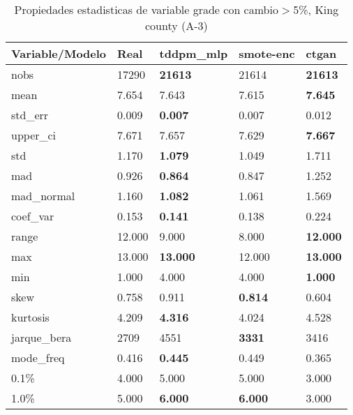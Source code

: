 \begin{table}[H]
\centering
\fontsize{8}{14}\selectfont
\caption{Propiedades estadisticas de variable grade con cambio\ensuremath{>}5\%, King county (A-3)}
\label{table-stats-king county-a-3-grade-short}
\begin{tabular}{|l|m{10em}|m{10em}|m{10em}|m{10em}|}
\hline
 \rowcolor[gray]{0.8}
Variable/Modelo & Real & tddpm\_mlp & smote-enc & ctgan \\
\hline nobs & 17290 & \bfseries 21613 & \cellcolor[rgb]{0.9, 0.54, 0.52} 21614 & \bfseries 21613 \\
\hline mean & 7.654 & 7.643 & \cellcolor[rgb]{0.9, 0.54, 0.52} 7.615 & \bfseries 7.645 \\
\hline std\_err & 0.009 & \bfseries 0.007 & 0.007 & \cellcolor[rgb]{0.9, 0.54, 0.52} 0.012 \\
\hline upper\_ci & 7.671 & 7.657 & \cellcolor[rgb]{0.9, 0.54, 0.52} 7.629 & \bfseries 7.667 \\
\hline std & 1.170 & \bfseries 1.079 & 1.049 & \cellcolor[rgb]{0.9, 0.54, 0.52} 1.711 \\
\hline mad & 0.926 & \bfseries 0.864 & 0.847 & \cellcolor[rgb]{0.9, 0.54, 0.52} 1.252 \\
\hline mad\_normal & 1.160 & \bfseries 1.082 & 1.061 & \cellcolor[rgb]{0.9, 0.54, 0.52} 1.569 \\
\hline coef\_var & 0.153 & \bfseries 0.141 & 0.138 & \cellcolor[rgb]{0.9, 0.54, 0.52} 0.224 \\
\hline range & 12.000 & 9.000 & \cellcolor[rgb]{0.9, 0.54, 0.52} 8.000 & \bfseries 12.000 \\
\hline max & 13.000 & \bfseries 13.000 & \cellcolor[rgb]{0.9, 0.54, 0.52} 12.000 & \bfseries 13.000 \\
\hline min & 1.000 & \cellcolor[rgb]{0.9, 0.54, 0.52} 4.000 & \cellcolor[rgb]{0.9, 0.54, 0.52} 4.000 & \bfseries 1.000 \\
\hline skew & 0.758 & 0.911 & \bfseries 0.814 & \cellcolor[rgb]{0.9, 0.54, 0.52} 0.604 \\
\hline kurtosis & 4.209 & \bfseries 4.316 & 4.024 & \cellcolor[rgb]{0.9, 0.54, 0.52} 4.528 \\
\hline jarque\_bera & 2709 & \cellcolor[rgb]{0.9, 0.54, 0.52} 4551 & \bfseries 3331 & 3416 \\
\hline mode\_freq & 0.416 & \bfseries 0.445 & 0.449 & \cellcolor[rgb]{0.9, 0.54, 0.52} 0.365 \\
\hline 0.1\% & 4.000 & 5.000 & 5.000 & 3.000 \\
\hline 1.0\% & 5.000 & \bfseries 6.000 & \bfseries 6.000 & \cellcolor[rgb]{0.9, 0.54, 0.52} 3.000 \\
\hline
\end{tabular}
\end{table}
